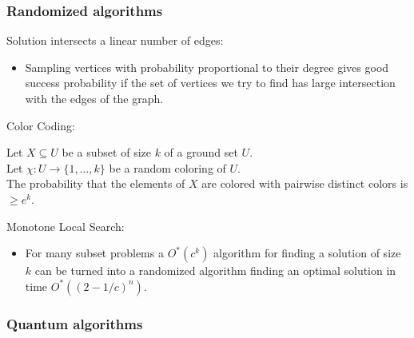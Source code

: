 %	
%			


\begin{frame}
 \frametitle{Randomized algorithms}
 
 Solution intersects a linear number of edges:
 \begin{itemize}
 	\item Sampling vertices with probability proportional to their degree gives good success probability if the set of vertices we try to find has large intersection with the edges of the graph.
 \end{itemize}
 
 Color Coding:
 \begin{lemma}
  Let $X\subseteq U$ be a subset of size $k$ of a ground set $U$.\\
  Let $\chi: U\rightarrow \{1,\dots,k\}$ be a random coloring of $U$.\\
  The probability that the elements of $X$ are colored with pairwise distinct colors is $\ge e^k$.  
 \end{lemma}

 Monotone Local Search:
 \begin{itemize}
	\item For many subset problems a $O^*(c^k)$ algorithm for finding a solution of size $k$ can be turned into a randomized algorithm finding an optimal solution in time $O^*((2-1/c)^n)$.
\end{itemize}

\end{frame}

\begin{frame}
	\frametitle{Quantum algorithms}
	

\end{frame}

